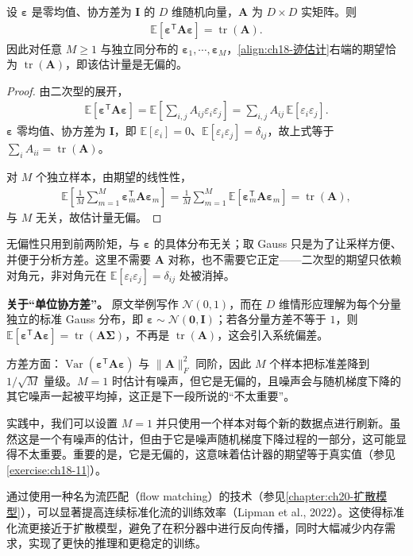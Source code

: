\documentclass[../../main.tex]{subfiles}
\begin{document}
\begin{proposition}[迹估计量的无偏性]\label{proposition:ch18-迹估计无偏}
设 $\bm{\varepsilon}$ 是零均值、协方差为 $\bm{I}$ 的 $D$ 维随机向量，$\bm{A}$ 为 $D\times D$ 实矩阵。则
\begin{align*}
  \mathbb{E}\left[\bm{\varepsilon}^{\mathsf T}\bm{A}\bm{\varepsilon}\right]=\operatorname{tr}(\bm{A}).
\end{align*}
因此对任意 $M\geqslant1$ 与独立同分布的 $\bm{\varepsilon}_1,\cdots,\bm{\varepsilon}_M$，\eqref{align:ch18-迹估计}右端的期望恰为 $\operatorname{tr}(\bm{A})$，即该估计量是无偏的。
\end{proposition}

\begin{proof}
由二次型的展开，
\begin{align*}
  \mathbb{E}\left[\bm{\varepsilon}^{\mathsf T}\bm{A}\bm{\varepsilon}\right]=\mathbb{E}\left[\sum_{i,j}A_{ij}\varepsilon_i\varepsilon_j\right]=\sum_{i,j}A_{ij}\,\mathbb{E}\left[\varepsilon_i\varepsilon_j\right].
\end{align*}
$\bm{\varepsilon}$ 零均值、协方差为 $\bm{I}$，即 $\mathbb{E}[\varepsilon_i]=0$、$\mathbb{E}[\varepsilon_i\varepsilon_j]=\delta_{ij}$，故上式等于 $\sum_{i}A_{ii}=\operatorname{tr}(\bm{A})$。

对 $M$ 个独立样本，由期望的线性性，
\begin{align*}
  \mathbb{E}\left[\frac{1}{M}\sum_{m=1}^{M}\bm{\varepsilon}_m^{\mathsf T}\bm{A}\bm{\varepsilon}_m\right]=\frac{1}{M}\sum_{m=1}^{M}\mathbb{E}\left[\bm{\varepsilon}_m^{\mathsf T}\bm{A}\bm{\varepsilon}_m\right]=\operatorname{tr}(\bm{A}),
\end{align*}
与 $M$ 无关，故估计量无偏。
\end{proof}

\begin{remark}
无偏性只用到前两阶矩，与 $\bm{\varepsilon}$ 的具体分布无关；取 Gauss 只是为了让采样方便、并便于分析方差。这里不需要 $\bm{A}$ 对称，也不需要它正定——二次型的期望只依赖对角元，非对角元在 $\mathbb{E}[\varepsilon_i\varepsilon_j]=\delta_{ij}$ 处被消掉。

\textbf{关于“单位协方差”。} 原文举例写作 $\mathcal{N}(0,1)$，而在 $D$ 维情形应理解为每个分量独立的标准 Gauss 分布，即 $\bm{\varepsilon}\sim\mathcal{N}(\bm{0},\bm{I})$；若各分量方差不等于 $1$，则 $\mathbb{E}[\bm{\varepsilon}^{\mathsf T}\bm{A}\bm{\varepsilon}]=\operatorname{tr}(\bm{A}\bm{\Sigma})$，不再是 $\operatorname{tr}(\bm{A})$，这会引入系统偏差。

方差方面：$\operatorname{Var}(\bm{\varepsilon}^{\mathsf T}\bm{A}\bm{\varepsilon})$ 与 $\|\bm{A}\|_F^{2}$ 同阶，因此 $M$ 个样本把标准差降到 $1/\sqrt{M}$ 量级。$M=1$ 时估计有噪声，但它是无偏的，且噪声会与随机梯度下降的其它噪声一起被平均掉，这正是下一段所说的“不太重要”。
\end{remark}

实践中，我们可以设置 $M=1$ 并只使用一个样本对每个新的数据点进行刷新。虽然这是一个有噪声的估计，但由于它是噪声随机梯度下降过程的一部分，这可能显得不太重要。重要的是，它是无偏的，这意味着估计器的期望等于真实值（参见\cref{exercise:ch18-11}）。

通过使用一种名为流匹配（flow matching）的技术（参见\cref{chapter:ch20-扩散模型}），可以显著提高连续标准化流的训练效率（Lipman et al., 2022）。这使得标准化流更接近于扩散模型，避免了在积分器中进行反向传播，同时大幅减少内存需求，实现了更快的推理和更稳定的训练。
\end{document}

